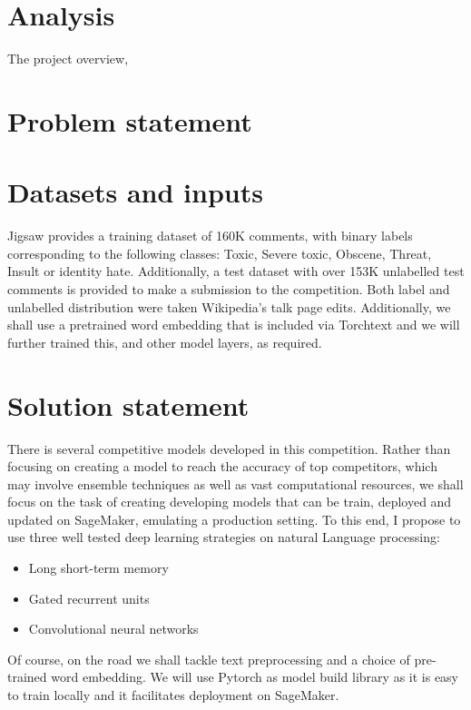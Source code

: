 \documentclass[book,preprintnumbers,11pt]{article}
\begin{document}
\section{Analysis}

The project overview, 

\section{Problem statement}




\section{Datasets and inputs}

 Jigsaw provides a training dataset  of 160K comments, with binary labels
 corresponding to the following classes:
 Toxic, Severe toxic, Obscene, Threat, Insult or  identity hate.
 Additionally, a test dataset  with over 153K unlabelled  test comments is provided to make 
 a submission to the competition.
 Both label and unlabelled distribution were taken Wikipedia's talk page edits. Additionally, 
 we shall use a pretrained word embedding that is included via Torchtext and we will further
trained  this, and other model layers,   as required. 
 

\section{Solution statement}

There is several competitive models developed in this competition. Rather than focusing 
on creating a model to reach the accuracy of top competitors, which may involve ensemble 
techniques as well as vast computational  resources, we shall focus on the task 
of creating developing models that can be train, deployed and updated on SageMaker,
emulating a production setting. To this end, 
I propose to use three well tested deep learning strategies on natural Language processing:

\begin{itemize}
\item Long short-term memory
\item Gated recurrent units
\item Convolutional neural networks
\end{itemize}
 
Of course, on the road we shall tackle text preprocessing and a choice of
pre-trained word embedding. We will use Pytorch as model build library as 
it is easy to train locally and it facilitates deployment on SageMaker.
 
\end{document}
